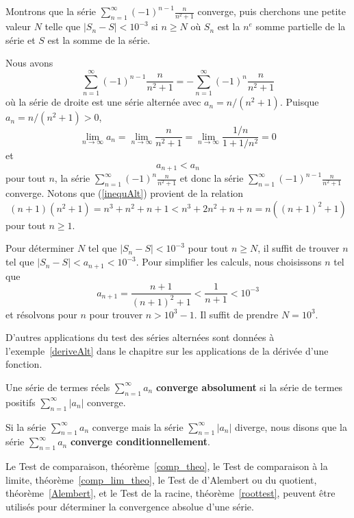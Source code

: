 {\begin{egg}
Montrons que la série
$\displaystyle \sum_{n=1}^\infty (-1)^{n-1}\frac{n}{n^2+1}$ converge,
puis cherchons une petite valeur $N$ telle que
$|S_n - S|< 10^{-3}$ si $n\geq N$ où $S_n$ est la $n^e$ somme
partielle de la série et $S$ est la somme de la série.

Nous avons
\[
\sum_{n=1}^\infty (-1)^{n-1}\frac{n}{n^2+1} =
-\sum_{n=1}^\infty (-1)^n\frac{n}{n^2+1}
\]
où la série de droite est une série alternée avec $a_n = n/(n^2+1)$.
Puisque $a_n = n/(n^2+1) >0$,
\[
\lim_{n\rightarrow \infty} a_n =
\lim_{n\rightarrow \infty} \frac{n}{n^2+1} =
\lim_{n\rightarrow \infty} \frac{1/n}{1+1/n^2} = 0
\]
et
\begin{equation}\label{inequAlt}
a_{n+1} < a_n
\end{equation}
pour tout $n$, la série
$\displaystyle \sum_{n=1}^\infty (-1)^n\frac{n}{n^2+1}$ et
donc la série
$\displaystyle \sum_{n=1}^\infty (-1)^{n-1}\frac{n}{n^2+1}$ converge.
Notons que (\ref{inequAlt}) provient de la relation
\[
(n+1)(n^2+1) = n^3 + n^2 + n + 1 < n^3 +2n^2 + n + n = n( (n+1)^2+1)
\]
pour tout $n\geq 1$.

Pour déterminer $N$ tel que $|S_n - S |<10^{-3}$ pour tout $n\geq N$,
il suffit de trouver $n$ tel que $|S_n - S |< a_{n+1} < 10^{-3}$.
Pour simplifier les calculs, nous choisissons $n$ tel que
\[
a_{n+1} = \frac{n+1}{(n+1)^2+1} < \frac{1}{n+1} < 10^{-3}
\]
et résolvons pour $n$ pour trouver $n > 10^3-1$.  Il suffit de
prendre $N=10^3$.
\end{egg}

D'autres applications du test des séries alternées sont données à
l'exemple~\ref{deriveAlt} dans le chapitre sur les applications de la
dérivée d'une fonction.

\begin{defn}
Une série de termes réels $\displaystyle \sum_{n=1}^\infty a_n$
{\bfseries converge absolument}
si la série de termes positifs $\displaystyle \sum_{n=1}^\infty |a_n|$
converge.

Si la série $\displaystyle \sum_{n=1}^\infty a_n$ converge mais la
série $\displaystyle \sum_{n=1}^\infty |a_n|$ diverge, nous disons que la
série $\displaystyle \sum_{n=1}^\infty a_n$
{\bfseries converge conditionnellement}.
\end{defn}

\begin{rmk}
Le Test de comparaison, théorème~\ref{comp_theo},
le Test de comparaison à la limite, théorème~\ref{comp_lim_theo},   
le Test de d'Alembert ou du quotient, théorème~\ref{Alembert}, et le
Test de la racine, théorème~\ref{roottest}, peuvent être utilisés pour
déterminer la convergence absolue d'une série.
\end{rmk}

}
